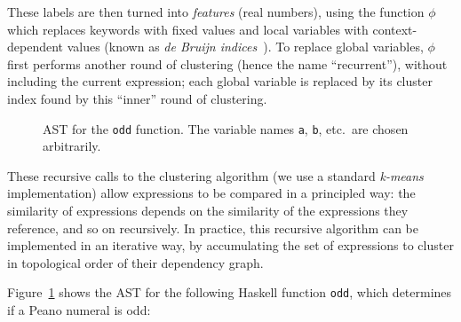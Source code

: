 \documentclass[]{default}
\newcommand{\id}[1]{\texttt{``#1''}}
\newcommand{\CVar}{\texttt{Var}}
\newcommand{\CApp}{\texttt{App}}
\newcommand{\CLam}{\texttt{Lam}}
\newcommand{\CCase}{\texttt{Case}}
\newcommand{\CLocal}{\texttt{Local}}
\newcommand{\CGlobal}{\texttt{Global}}
\newcommand{\CConstructor}{\texttt{Constructor}}
\newcommand{\CAlt}{\texttt{Alt}}
\newcommand{\CDataAlt}{\texttt{DataAlt}}
\begin{document}
These labels are then turned into \emph{features} (real numbers), using the function $\phi$ which replaces keywords with fixed values and local variables with context-dependent values (known as \emph{de Bruijn indices}~\cite{de1972lambda}). To replace global variables, $\phi$ first performs another round of clustering (hence the name
``recurrent''), without including the current expression; each global
variable is replaced by its cluster index found by this ``inner'' round
of clustering.

\begin{figure}
    \begin{small}
    \end{small}
    \caption{AST for the \texttt{odd} function. The variable names \texttt{a}, \texttt{b}, etc.\ are chosen arbitrarily.}
    \label{fig:astexample}
\end{figure}

These recursive calls to the clustering algorithm (we use a standard
\emph{k-means} implementation) allow expressions to be compared in a
principled way: the similarity of expressions depends on the similarity of the expressions they reference, and so on recursively. In practice, this recursive
algorithm can be implemented in an iterative way, by accumulating the set of expressions to cluster in topological order of their dependency graph.

Figure~\ref{fig:astexample} shows the AST for the following Haskell function \texttt{odd}, which determines if a Peano numeral is odd:
\end{document}
